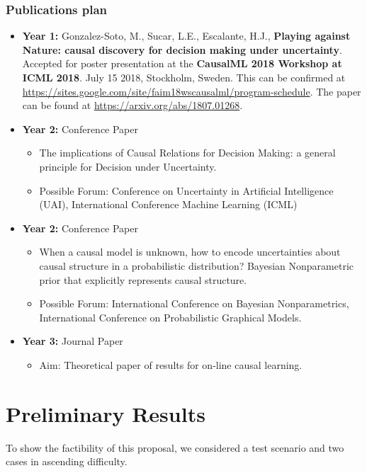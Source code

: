 \documentclass[english,letterpaper,12pt,final]{article}
\theoremstyle{definition}
\begin{document}
\subsubsection{Publications plan}
\begin{itemize}
\item \textbf{Year 1:} Gonzalez-Soto, M., Sucar, L.E., Escalante, H.J., \textbf{Playing against Nature: causal discovery for decision making under uncertainty}. Accepted for poster presentation at the \textbf{CausalML 2018 Workshop at ICML 2018}. July 15 2018, Stockholm, Sweden. This can be confirmed at \url{https://sites.google.com/site/faim18wscausalml/program-schedule}. The paper can be found at \url{https://arxiv.org/abs/1807.01268}.
\item \textbf{Year 2:} Conference Paper
		\begin{itemize}
		\item The implications of Causal Relations for Decision Making: a general principle for Decision under Uncertainty.
		\item Possible Forum: Conference on Uncertainty in Artificial Intelligence (UAI), International Conference Machine Learning (ICML)
		\end{itemize}
\item \textbf{Year 2:} Conference Paper
	\begin{itemize}
	\item When a causal model is unknown, how to encode uncertainties about causal structure in a probabilistic distribution? Bayesian Nonparametric prior that explicitly represents causal structure.
	\item Possible Forum: International Conference on Bayesian Nonparametrics, International Conference on Probabilistic Graphical Models.
	\end{itemize}
\item \textbf{Year 3:} Journal Paper
		\begin{itemize}
			\item Aim: Theoretical paper of results for on-line causal learning.
		\end{itemize}
\end{itemize}

\newpage
\section{Preliminary Results}
To show the factibility of this proposal, we considered a test scenario and two cases in ascending difficulty.
\end{document}
